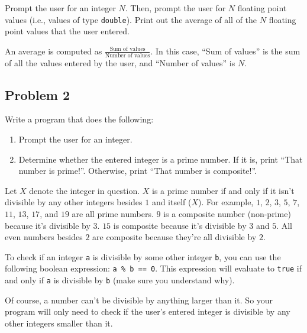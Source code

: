 \documentclass{article}
\newenvironment{hint}
    {\begin{tcolorbox}[title=Hint,colframe=white!70!blue,colback=white]}
    {\end{tcolorbox}}
\begin{document}
Prompt the user for an integer $N$. Then, prompt the user for $N$ floating point values (i.e., values of type \texttt{double}). Print out the average of all of the $N$ floating point values that the user entered.

\begin{hint}
    An average is computed as $\frac{\text{Sum of values}}{\text{Number of values}}$. In this case, ``Sum of values'' is the sum of all the values entered by the user, and ``Number of values'' is $N$.
\end{hint}

\subsection{Problem 2}

Write a program that does the following:

\begin{enumerate}
    \item Prompt the user for an integer.
    \item Determine whether the entered integer is a prime number. If it is, print ``That number is prime!''. Otherwise, print ``That number is composite!''.
\end{enumerate}

\begin{hint}
    Let $X$ denote the integer in question. $X$ is a prime number if and only if it isn't divisible by any other integers besides $1$ and itself ($X$). For example, $1$, $2$, $3$, $5$, $7$, $11$, $13$, $17$, and $19$ are all prime numbers. $9$ is a composite number (non-prime) because it's divisible by $3$. $15$ is composite because it's divisible by $3$ and $5$. All even numbers besides $2$ are composite because they're all divisible by $2$.

    \vspace{6pt}

    To check if an integer \texttt{a} is divisible by some other integer \texttt{b}, you can use the following boolean expression: \texttt{a \% b == 0}. This expression will evaluate to \texttt{true} if and only if \texttt{a} is divisible by \texttt{b} (make sure you understand why).

    \vspace{6pt}

    Of course, a number can't be divisible by anything larger than it. So your program will only need to check if the user's entered integer is divisible by any other integers smaller than it.
\end{hint}
\end{document}
